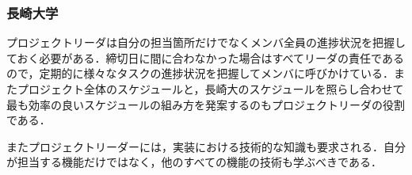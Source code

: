 \subsubsection{長崎大学}
\par プロジェクトリーダは自分の担当箇所だけでなくメンバ全員の進捗状況を把握しておく必要がある．締切日に間に合わなかった場合はすべてリーダの責任であるので，定期的に様々なタスクの進捗状況を把握してメンバに呼びかけている．またプロジェクト全体のスケジュールと，長崎大のスケジュールを照らし合わせて最も効率の良いスケジュールの組み方を発案するのもプロジェクトリーダの役割である．
\par またプロジェクトリーダーには，実装における技術的な知識も要求される．自分が担当する機能だけではなく，他のすべての機能の技術も学ぶべきである．
